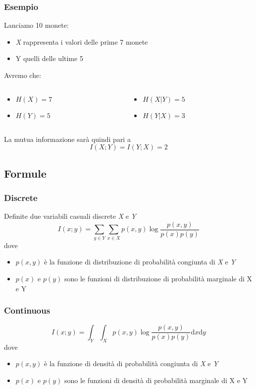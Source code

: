 \documentclass{beamer}
\begin{document}
\begin{frame}
	\frametitle{Esempio}
	Lanciamo 10 monete:
	\begin{itemize}
		\item \emph{X} rappresenta i valori delle prime 7 monete
		\item Y quelli delle ultime 5
	\end{itemize}
	Avremo che:
	\begin{columns}
		\begin{column}{0.5\textwidth}
			\begin{itemize}
				\item $H(X) = 7$
				\item $H(Y ) = 5$\newline
			\end{itemize}
		\end{column}
		\begin{column}{0.5\textwidth}
			\begin{itemize}
				\item $H(X|Y ) = 5$
				\item $H(Y|X) = 3$\newline
			\end{itemize}
		\end{column}
	\end{columns}
	La mutua informazione sarà quindi pari a
$$I(X; Y ) = I(Y ; X) = 2 $$
\end{frame}
\subsection{Formule}
\begin{frame}
	\frametitle{Discrete}
	Definite due variabili casuali discrete \emph{X} e \emph{Y}
	$$ I (x;y) = \sum\limits_{y \in Y} \sum\limits_{x \in X} p(x,y)\log \frac{p(x,y)}{p(x)p(y)}$$
	dove
	\begin{itemize}
		\item $p(x,y)$ è la funzione di distribuzione di probabilità congiunta di \emph{X} e \emph{Y}
		\item $p(x)$ e $p(y)$ sono le funzioni di distribuzione di probabilità marginale di X e Y
	\end{itemize}
\end{frame}
\begin{frame}
	\frametitle{Continuous}
	$$ I (x;y) = \int_Y \int_X p(x,y)\log \frac{p(x,y)}{p(x)p(y)} \mathrm{d}x \mathrm{d}y$$
	dove
	\begin{itemize}
		\item $p(x,y)$ è la funzione di densità di probabilità congiunta di \emph{X} e \emph{Y}
		\item $p(x)$ e $p(y)$ sono le funzioni di densità di probabilità marginale di X e Y
	\end{itemize}
\end{frame}
\end{document}
